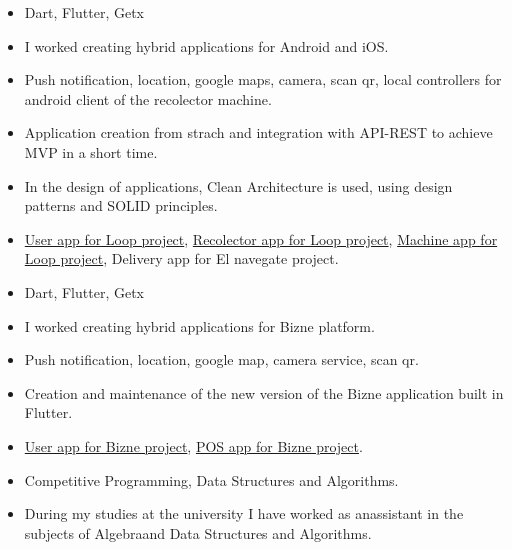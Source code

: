 \documentclass[10pt,a4paper]{altacv}
\begin{document}
\begin{itemize}
	\item Dart, Flutter, Getx
	\item I worked creating hybrid applications for Android and iOS.
	\item Push notification, location, google maps, camera,
	      scan qr, local controllers for android client of the recolector machine. 
	\item Application creation from strach and integration with API-REST to achieve MVP in a short time.
	\item In the design of applications, Clean Architecture is used, using design patterns and SOLID principles.
	\item \href{https://land.mideyneutraliza.com/}{User app for Loop project},
	      \href{https://land.mideyneutraliza.com/}{Recolector app for Loop project}, \href{https://land.mideyneutraliza.com/}{Machine app for Loop project}, Delivery app for El navegate project.
	      
\end{itemize}

\divider


\begin{itemize}

	\item Dart, Flutter, Getx
	\item I worked creating hybrid applications for Bizne platform.
	\item Push notification, location, google map, camera service,
	      scan qr. 
	\item Creation and maintenance of the new version of the Bizne application built in Flutter.
	\item \href{https://play.google.com/store/apps/details?id=mx.devbizne.bizne&hl=en-US}{User app for Bizne project},
	      \href{https://play.google.com/store/apps/details?id=mx.bizne.kitchen&hl=en-US}{POS app for Bizne project}.
\end{itemize}

\divider


\begin{itemize}

	\item Competitive Programming, Data Structures and Algorithms.
	\item  During my studies at the university I have worked as anassistant in the subjects of Algebraand Data Structures and Algorithms.
	      
	      
\end{itemize}
\end{document}
